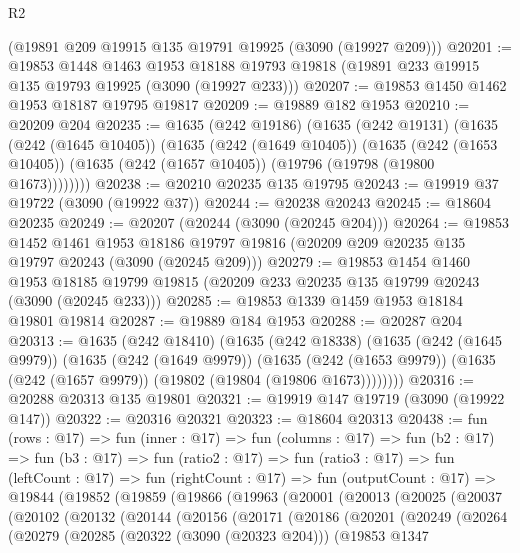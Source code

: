\begin{lexlean}{R2}
\begin{coremodule}
    (@19891 @209 @19915 @135 @19791 @19925 (@3090 (@19927 @209)))
@20201 := @19853
    @1448
    @1463
    @1953
    @18188
    @19793
    @19818
    (@19891 @233 @19915 @135 @19793 @19925 (@3090 (@19927 @233)))
@20207 := @19853 @1450 @1462 @1953 @18187 @19795 @19817
@20209 := @19889 @182 @1953
@20210 := @20209 @204
@20235 := @1635
    (@242 @19186)
    (@1635
      (@242 @19131)
      (@1635
        (@242 (@1645 @10405))
        (@1635
          (@242 (@1649 @10405))
          (@1635
            (@242 (@1653 @10405))
            (@1635 (@242 (@1657 @10405)) (@19796 (@19798 (@19800 @1673))))))))
@20238 := @20210 @20235 @135 @19795
@20243 := @19919 @37 @19722 (@3090 (@19922 @37))
@20244 := @20238 @20243
@20245 := @18604 @20235
@20249 := @20207 (@20244 (@3090 (@20245 @204)))
@20264 := @19853
    @1452
    @1461
    @1953
    @18186
    @19797
    @19816
    (@20209 @209 @20235 @135 @19797 @20243 (@3090 (@20245 @209)))
@20279 := @19853
    @1454
    @1460
    @1953
    @18185
    @19799
    @19815
    (@20209 @233 @20235 @135 @19799 @20243 (@3090 (@20245 @233)))
@20285 := @19853 @1339 @1459 @1953 @18184 @19801 @19814
@20287 := @19889 @184 @1953
@20288 := @20287 @204
@20313 := @1635
    (@242 @18410)
    (@1635
      (@242 @18338)
      (@1635
        (@242 (@1645 @9979))
        (@1635
          (@242 (@1649 @9979))
          (@1635
            (@242 (@1653 @9979))
            (@1635 (@242 (@1657 @9979)) (@19802 (@19804 (@19806 @1673))))))))
@20316 := @20288 @20313 @135 @19801
@20321 := @19919 @147 @19719 (@3090 (@19922 @147))
@20322 := @20316 @20321
@20323 := @18604 @20313
@20438 := fun (rows : @17) =>
  fun (inner : @17) =>
  fun (columns : @17) =>
  fun (b2 : @17) =>
  fun (b3 : @17) =>
  fun (ratio2 : @17) =>
  fun (ratio3 : @17) =>
  fun (leftCount : @17) =>
  fun (rightCount : @17) =>
  fun (outputCount : @17) =>
  @19844
    (@19852
      (@19859
        (@19866
          (@19963
            (@20001
              (@20013
                (@20025
                  (@20037
                    (@20102
                      (@20132
                        (@20144
                          (@20156
                            (@20171
                              (@20186
                                (@20201
                                  (@20249
                                    (@20264
                                      (@20279
                                        (@20285
                                          (@20322 (@3090 (@20323 @204)))
                                          (@19853
                                            @1347

\end{coremodule}
\end{lexlean}
